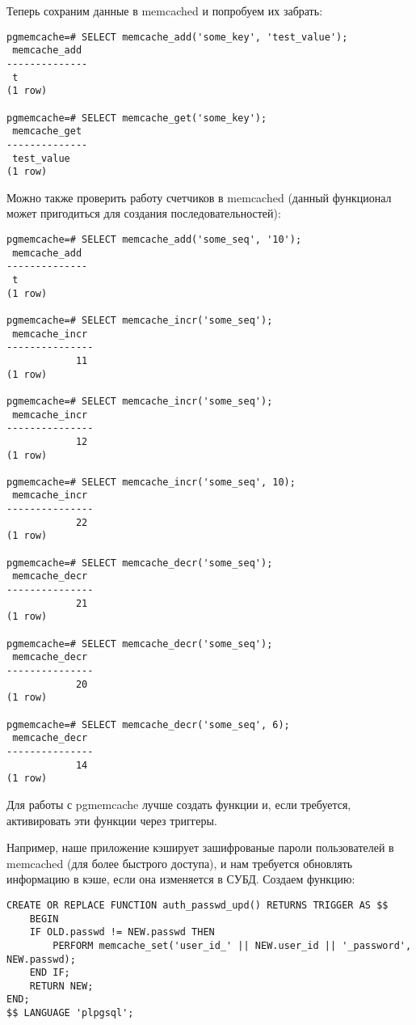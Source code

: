 Теперь сохраним данные в memcached и попробуем их забрать:

\begin{lstlisting}[label=lst:pgcache9,caption=Проверка]
pgmemcache=# SELECT memcache_add('some_key', 'test_value');
 memcache_add
--------------
 t
(1 row)

pgmemcache=# SELECT memcache_get('some_key');
 memcache_get
--------------
 test_value
(1 row)

\end{lstlisting}

Можно также проверить работу счетчиков в memcached (данный функционал может пригодиться для создания последовательностей):

\begin{lstlisting}[label=lst:pgcache10,caption=Проверка]
pgmemcache=# SELECT memcache_add('some_seq', '10');
 memcache_add
--------------
 t
(1 row)

pgmemcache=# SELECT memcache_incr('some_seq');
 memcache_incr
---------------
            11
(1 row)

pgmemcache=# SELECT memcache_incr('some_seq');
 memcache_incr
---------------
            12
(1 row)

pgmemcache=# SELECT memcache_incr('some_seq', 10);
 memcache_incr
---------------
            22
(1 row)

pgmemcache=# SELECT memcache_decr('some_seq');
 memcache_decr
---------------
            21
(1 row)

pgmemcache=# SELECT memcache_decr('some_seq');
 memcache_decr
---------------
            20
(1 row)

pgmemcache=# SELECT memcache_decr('some_seq', 6);
 memcache_decr
---------------
            14
(1 row)

\end{lstlisting}

Для работы с pgmemcache лучше создать функции и, если требуется, активировать эти функции через триггеры.

Например, наше приложение кэширует зашифрованые пароли пользователей в memcached (для более быстрого доступа), и нам требуется обновлять информацию в кэше, если она изменяется в СУБД. Создаем функцию:

\begin{lstlisting}[label=lst:pgcache11,caption=Функция для обновления данных в кэше]
CREATE OR REPLACE FUNCTION auth_passwd_upd() RETURNS TRIGGER AS $$
	BEGIN
	IF OLD.passwd != NEW.passwd THEN
		PERFORM memcache_set('user_id_' || NEW.user_id || '_password', NEW.passwd);
	END IF;
	RETURN NEW;
END;
$$ LANGUAGE 'plpgsql';
\end{lstlisting}

